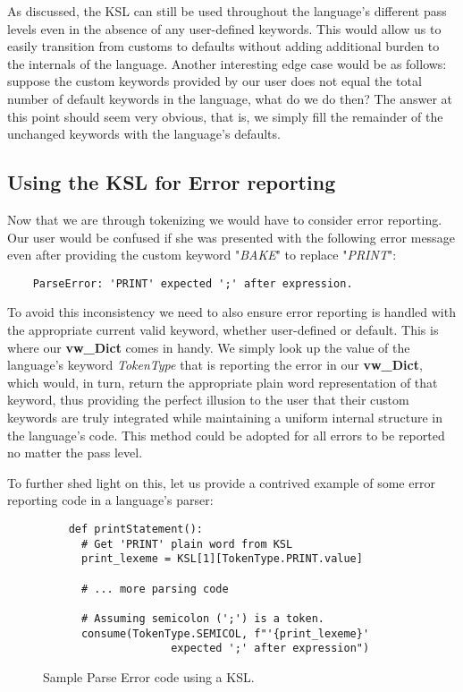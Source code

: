 \documentclass{article}
\begin{document}
As discussed, the KSL can still be used throughout the language's different pass levels even in the absence of any user-defined keywords. This would allow us to easily transition from customs to defaults without adding additional burden to the internals of the language. Another interesting edge case would be as follows: suppose the custom keywords provided by our user does not equal the total number of default keywords in the language, what do we do then? The answer at this point should seem very obvious, that is, we simply fill the remainder of the unchanged keywords with the language's defaults.

\subsection{Using the KSL for Error reporting}

Now that we are through tokenizing we would have to consider error reporting. Our user would be confused if she was presented with the following error message even after providing the custom keyword "\textit{BAKE}" to replace "\textit{PRINT}":

\begin{verbatim}
    ParseError: 'PRINT' expected ';' after expression.
\end{verbatim}

To avoid this inconsistency we need to also ensure error reporting is handled with the appropriate current valid keyword, whether user-defined or default. This is where our \textbf{vw\_Dict} comes in handy. We simply look up the value of the language's keyword \textit{TokenType} that is reporting the error in our \textbf{vw\_Dict}, which would, in turn, return the appropriate plain word representation of that keyword, thus providing the perfect illusion to the user that their custom keywords are truly integrated while maintaining a uniform internal structure in the language's code. This method could be adopted for all errors to be reported no matter the pass level.

To further shed light on this, let us provide a contrived example of some error reporting code in a language's parser:

\begin{figure}[ht]
  \begin{verbatim}
    def printStatement():
      # Get 'PRINT' plain word from KSL
      print_lexeme = KSL[1][TokenType.PRINT.value]

      # ... more parsing code

      # Assuming semicolon (';') is a token.
      consume(TokenType.SEMICOL, f"'{print_lexeme}' 
                    expected ';' after expression")
  \end{verbatim}
  \caption{Sample Parse Error code using a KSL.}
  \label{fig:parse-error-code}
\end{figure}
\end{document}
